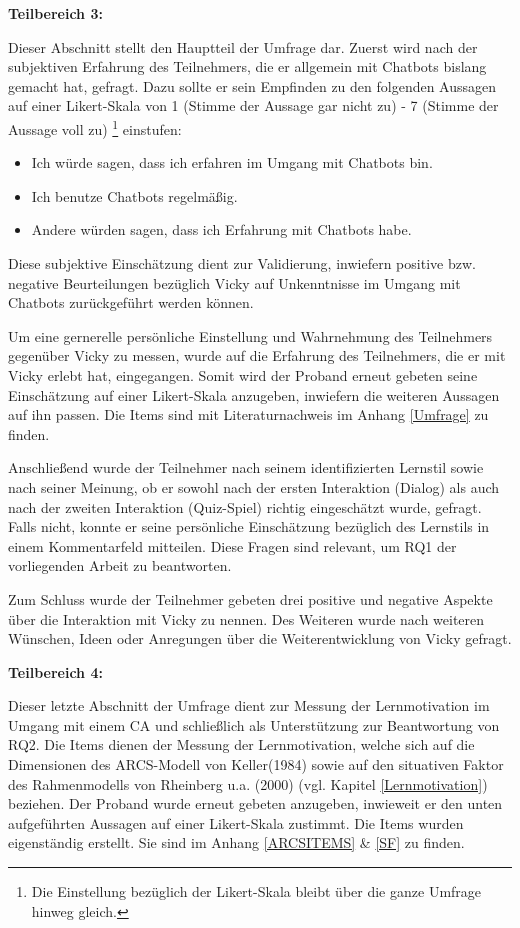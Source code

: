 \textbf{Teilbereich 3:} 

Dieser Abschnitt stellt den Hauptteil der Umfrage dar. 
Zuerst wird nach der subjektiven Erfahrung des Teilnehmers, die er allgemein
mit Chatbots bislang gemacht hat, gefragt. Dazu sollte er sein Empfinden zu den folgenden Aussagen 
auf einer Likert-Skala von 1 (Stimme der Aussage gar nicht zu) - 7 (Stimme der Aussage voll zu) \footnote{Die Einstellung bezüglich der Likert-Skala bleibt über die ganze Umfrage hinweg gleich.}
einstufen:
\begin{itemize}
    \item \glqq Ich würde sagen, dass ich erfahren im Umgang mit Chatbots bin.\grqq{} 
    \item \glqq Ich benutze Chatbots regelmäßig.\grqq{} 
    \item \glqq Andere würden sagen, dass ich Erfahrung mit Chatbots habe.\grqq{} 
\end{itemize}
Diese subjektive Einschätzung dient zur Validierung, inwiefern positive bzw. negative Beurteilungen 
bezüglich Vicky auf Unkenntnisse im Umgang mit Chatbots zurückgeführt werden können. 

Um eine gernerelle persönliche Einstellung und Wahrnehmung des Teilnehmers gegenüber Vicky zu messen, 
wurde auf die Erfahrung des Teilnehmers, die er mit Vicky erlebt hat, eingegangen.
Somit wird der Proband erneut gebeten 
seine Einschätzung auf einer Likert-Skala anzugeben, inwiefern die weiteren Aussagen auf ihn passen. 
Die Items sind mit Literaturnachweis im Anhang \ref{Umfrage} zu finden.

Anschließend wurde der Teilnehmer nach seinem identifizierten Lernstil sowie 
nach seiner Meinung, ob er sowohl nach der ersten Interaktion (Dialog) als auch nach 
der zweiten Interaktion (Quiz-Spiel) richtig eingeschätzt wurde, gefragt. Falls nicht, 
konnte er seine persönliche Einschätzung bezüglich des Lernstils in einem 
Kommentarfeld mitteilen. Diese Fragen sind relevant, um RQ1 der vorliegenden 
Arbeit zu beantworten. 

Zum Schluss wurde der Teilnehmer gebeten drei positive und negative Aspekte über die 
Interaktion mit Vicky zu nennen. Des Weiteren wurde nach weiteren Wünschen, Ideen oder Anregungen über
die Weiterentwicklung von Vicky gefragt. 

\pagebreak

\textbf{Teilbereich 4:}

Dieser letzte Abschnitt der Umfrage dient zur Messung der Lernmotivation im 
Umgang mit einem CA und schließlich als Unterstützung zur Beantwortung von RQ2.
Die Items dienen der Messung der Lernmotivation, welche
sich auf die Dimensionen des ARCS-Modell von Keller(1984) sowie auf den situativen Faktor des Rahmenmodells von Rheinberg u.a. (2000) (vgl. Kapitel \ref{Lernmotivation})
beziehen. Der Proband wurde erneut gebeten anzugeben, inwieweit er den unten aufgeführten Aussagen auf einer Likert-Skala zustimmt. 
Die Items wurden eigenständig erstellt. Sie sind im Anhang \ref{ARCSITEMS} \& \ref{SF} zu finden.

